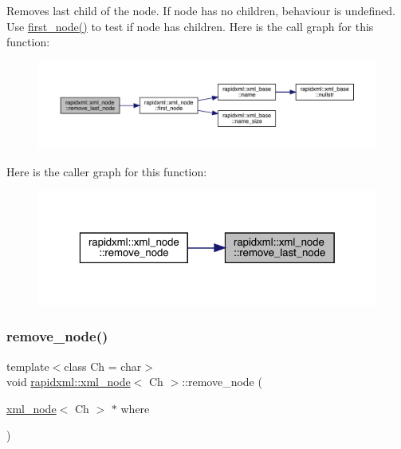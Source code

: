 Removes last child of the node. If node has no children, behaviour is undefined. Use \mbox{\hyperlink{classrapidxml_1_1xml__node_acdf3691224d683f50692616a92a75d3f}{first\+\_\+node()}} to test if node has children. Here is the call graph for this function\+:\nopagebreak
\begin{figure}[H]
\begin{center}
\leavevmode
\includegraphics[width=350pt]{classrapidxml_1_1xml__node_a9182512e948ec451a83f116cce7c7674_cgraph}
\end{center}
\end{figure}
Here is the caller graph for this function\+:\nopagebreak
\begin{figure}[H]
\begin{center}
\leavevmode
\includegraphics[width=323pt]{classrapidxml_1_1xml__node_a9182512e948ec451a83f116cce7c7674_icgraph}
\end{center}
\end{figure}
\mbox{\label{classrapidxml_1_1xml__node_a98289923eb9e8889418a9eb0207ea35c}} 
\subsubsection{\texorpdfstring{remove\_node()}{remove\_node()}}
{\footnotesize\ttfamily template$<$class Ch = char$>$ \\
void \mbox{\hyperlink{classrapidxml_1_1xml__node}{rapidxml\+::xml\+\_\+node}}$<$ Ch $>$\+::remove\+\_\+node (\begin{DoxyParamCaption}\item[{\mbox{\hyperlink{classrapidxml_1_1xml__node}{xml\+\_\+node}}$<$ Ch $>$ $\ast$}]{where }\end{DoxyParamCaption})\hspace{0.3cm}{\ttfamily [inline]}}



